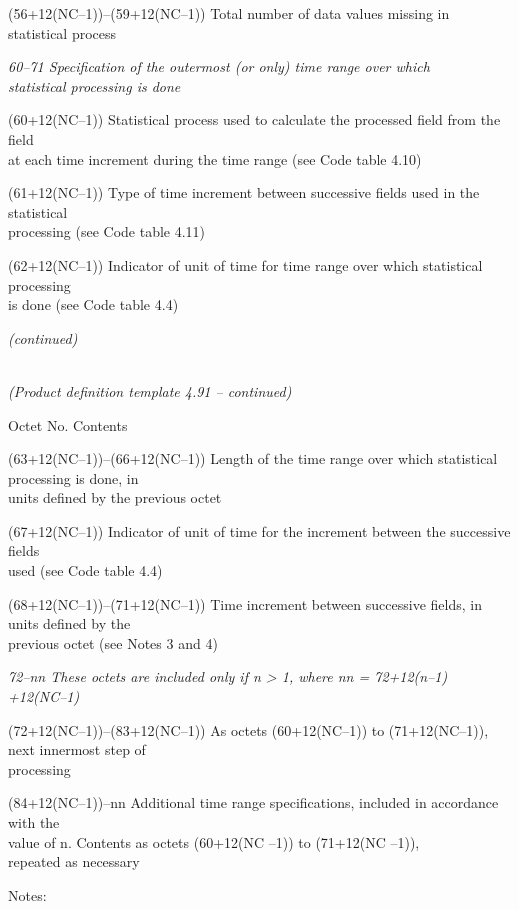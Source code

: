 (56+12(NC--1))--(59+12(NC--1)) Total number of data values missing in statistical process

\emph{60--71 Specification of the outermost (or only) time range over which}\\
\emph{statistical processing is done}

(60+12(NC--1)) Statistical process used to calculate the processed field from the field\\
at each time increment during the time range (see Code table 4.10)

(61+12(NC--1)) Type of time increment between successive fields used in the statistical\\
processing (see Code table 4.11)

(62+12(NC--1)) Indicator of unit of time for time range over which statistical processing\\
is done (see Code table 4.4)

\emph{(continued)}

\emph{\\
(Product definition template 4.91 -- continued)}

Octet No. Contents

(63+12(NC--1))--(66+12(NC--1)) Length of the time range over which statistical processing is done, in\\
units defined by the previous octet

(67+12(NC--1)) Indicator of unit of time for the increment between the successive fields\\
used (see Code table 4.4)

(68+12(NC--1))--(71+12(NC--1)) Time increment between successive fields, in units defined by the\\
previous octet (see Notes 3 and 4)

\emph{72--nn These octets are included only if n \textgreater{} 1, where nn = 72+12(n--1)}\\
\emph{+12(NC--1)}

(72+12(NC--1))--(83+12(NC--1)) As octets (60+12(NC--1)) to (71+12(NC--1)), next innermost step of\\
processing

(84+12(NC--1))--nn Additional time range specifications, included in accordance with the\\
value of n. Contents as octets (60+12(NC --1)) to (71+12(NC --1)),\\
repeated as necessary

Notes:

